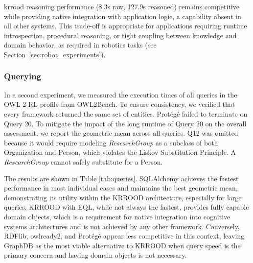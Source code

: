 \documentclass[a4paper,fleqn]{cas-sc}
\begin{document}
\ac{krrood} reasoning performance (8.3s raw, 127.9s reasoned) remains competitive while providing native integration with application logic, a capability absent in all other systems. This trade-off is appropriate for applications requiring runtime introspection, procedural reasoning, or tight coupling between knowledge and domain behavior, as required in robotics tasks (see Section~\ref{sec:robot_experiments}).

\subsubsection{Querying}

In a second experiment, we measured the execution times of all queries in the OWL 2 RL profile from OWL2Bench. To ensure consistency, we verified that every framework returned the same set of entities. Protégé failed to terminate on Query 20. To mitigate the impact of the long runtime of Query 20 on the overall assessment, we report the geometric mean across all queries. Q12 was omitted because it would require modeling \textit{ResearchGroup} as a subclass of both Organization and Person, which violates the Liskov Substitution Principle. A \textit{ResearchGroup} cannot safely substitute for a Person.

The results are shown in Table \ref{tab:queries}. SQLAlchemy achieves the fastest performance in most individual cases and maintains the best geometric mean, demonstrating its utility within the KRROOD architecture, especially for large queries. KRROOD with EQL, while not always the fastest, provides fully capable domain objects, which is a requirement for native integration into cognitive systems architectures and is not achieved by any other framework. Conversely, RDFlib, owlready2, and Protégé appear less competitive in this context, leaving GraphDB as the most viable alternative to KRROOD when query speed is the primary concern and having domain objects is not necessary.

\begin{table}[t]
  \centering
  \caption{Loading and reasoning times for different frameworks in seconds. The raw data contains 54,897 statements. The reasoned data contains 1,502,966 statements.
  }
  \label{tab:baselines}
\end{table}
\end{document}
